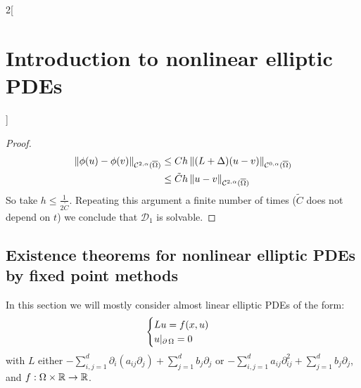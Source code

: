 \documentclass[../../../main_math.tex]{subfiles}
\begin{document}
\begin{multicols}{2}[\section{Introduction to nonlinear elliptic PDEs}]
\begin{proof}
    \begin{align*}
      \left\|\phi(u)-\phi(v)\right\|_{\mathcal{C}^{2,\alpha}(\overline{\Omega})} & \leq Ch\left\|(L+\Delta)(u-v)\right\|_{\mathcal{C}^{0,\alpha}(\overline{\Omega})} \\
                                                                         & \leq \tilde{C}h\left\|u-v\right\|_{\mathcal{C}^{2,\alpha}(\overline{\Omega})}
    \end{align*}
    So take $h\leq \frac{1}{2\tilde{C}}$. Repeating this argument a finite number of times ($\tilde{C}$ does not depend on $t$) we conclude that $\mathcal{D}_1$ is solvable.
  \end{proof}
  \subsection{Existence theorems for nonlinear elliptic PDEs by fixed point methods}
  In this section we will mostly consider almost linear elliptic PDEs of the form:
  \begin{equation}\label{INEPDE:AlmostLinear}
    \begin{cases}
      Lu=f(x,u) \\
      u|_{\operatorname{\partial}{\Omega}}=0
    \end{cases}
  \end{equation}
  with $L$ either $-\sum_{i,j=1}^d\partial_i(a_{ij}\partial_j)+\sum_{j=1}^db_j\partial_j$ or $-\sum_{i,j=1}^d a_{ij} \partial_{ij}^2+\sum_{j=1}^db_j\partial_j$, and $f:\Omega\times \mathbb{R}\to \mathbb{R}$.

\end{multicols}
\end{document}
